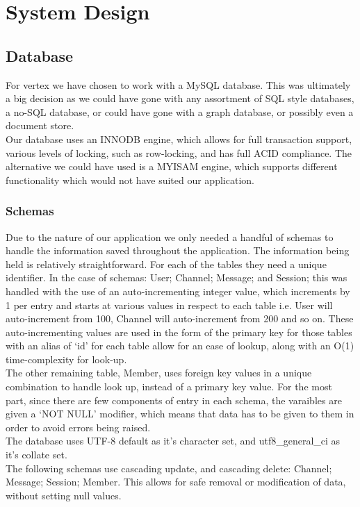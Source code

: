 \chapter{System Design}
\section{Database}
For vertex we have chosen to work with a MySQL database. This was ultimately a big decision as we could have gone with any assortment of SQL style databases, a no-SQL database, or could have gone with a graph database, or possibly even a document store.
\\ Our database uses an INNODB engine, which allows for full transaction support, various levels of locking, such as row-locking, and has full ACID compliance. The alternative we could have used is a MYISAM engine, which supports different functionality which would not have suited our application.

\subsection{Schemas}
Due to the nature of our application we only needed a handful of schemas to handle the information saved throughout the application. The information being held is relatively straightforward. For each of the tables they need a unique identifier. In the case of schemas: User; Channel; Message; and Session; this was handled with the use of an auto-incrementing integer value, which increments by 1 per entry and starts at various values in respect to each table i.e. User will auto-increment from 100, Channel will auto-increment from 200 and so on. These auto-incrementing values are used in the form of the primary key for those tables with an alias of ‘id’ for each table allow for an ease of lookup, along with an O(1) time-complexity for look-up.
\\ The other remaining table, Member, uses foreign key values in a unique combination to handle look up, instead of a primary key value. For the most part, since there are few components of entry in each schema, the varaibles are given a ‘NOT NULL’ modifier, which means that data has to be given to them in order to avoid errors being raised.
\\ The database uses UTF-8 default as it’s character set, and utf8\_general\_ci as it’s collate set.
\\ The following schemas use cascading update, and cascading delete: Channel; Message; Session; Member. This allows for safe removal or modification of data, without setting null values.

